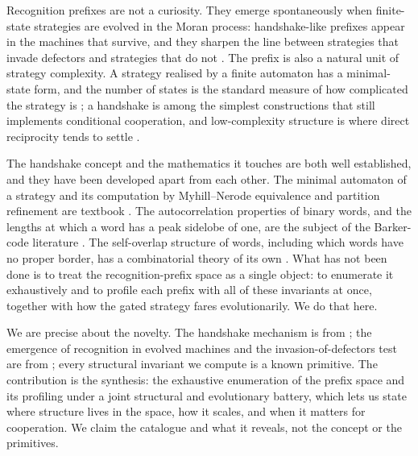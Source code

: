 Recognition prefixes are not a curiosity. They emerge spontaneously when finite-
state strategies are evolved in the Moran process: handshake-like prefixes
appear in the machines that survive, and they sharpen the line between strategies
that invade defectors and strategies that do not \citep{knight2018}. The prefix
is also a natural unit of strategy complexity. A strategy realised by a finite
automaton has a minimal-state form, and the number of states is the standard
measure of how complicated the strategy is \citep{rubinstein1986,abreu1988}; a
handshake is among the simplest constructions that still implements conditional
cooperation, and low-complexity structure is where direct reciprocity tends to
settle \citep{press2012,hilbe2018}.

The handshake concept and the mathematics it touches are both well established,
and they have been developed apart from each other. The minimal automaton of a
strategy and its computation by Myhill--Nerode equivalence and partition
refinement are textbook \citep{nerode1958,hopcroft1971,rubinstein1986}. The
autocorrelation properties of binary words, and the lengths at which a word has a
peak sidelobe of one, are the subject of the Barker-code literature
\citep{barker1953}. The self-overlap structure of words, including which words
have no proper border, has a combinatorial theory of its own
\citep{guibas1981}. What has not been done is to treat the recognition-prefix
space as a single object: to enumerate it exhaustively and to profile each prefix
with all of these invariants at once, together with how the gated strategy fares
evolutionarily. We do that here.

We are precise about the novelty. The handshake mechanism is from
\citet{robson1990}; the emergence of recognition in evolved machines and the
invasion-of-defectors test are from \citet{knight2018}; every structural
invariant we compute is a known primitive. The contribution is the synthesis:
the exhaustive enumeration of the prefix space and its profiling under a joint
structural and evolutionary battery, which lets us state where structure lives in
the space, how it scales, and when it matters for cooperation. We claim the
catalogue and what it reveals, not the concept or the primitives.

